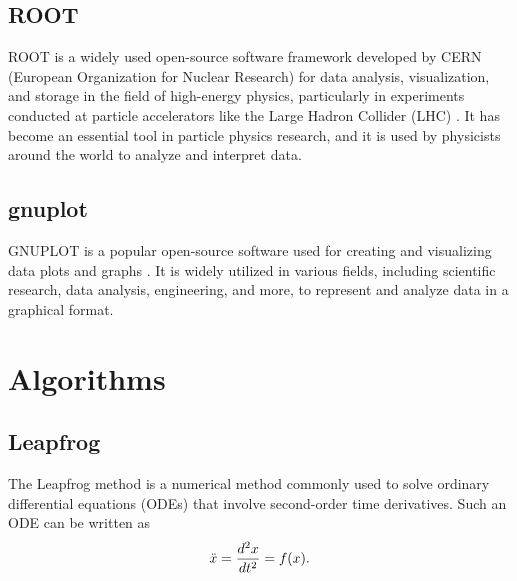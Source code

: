 \documentclass[a4paper,oneside,12pt]{report}
\numberwithin{equation}{chapter}
\begin{document}
\subsection{ROOT}
ROOT is a widely used open-source software framework developed by CERN (European Organization for Nuclear Research) for data analysis,
visualization, and storage in the field of high-energy physics, particularly in experiments conducted at particle accelerators 
like the Large Hadron Collider (LHC) \cite{root}. It has become an essential tool in particle physics research, 
and it is used by physicists around the world to analyze and interpret data.

\subsection{gnuplot}
GNUPLOT is a popular open-source software used for creating and visualizing data plots and graphs  \cite{gnuplot}. 
It is widely utilized in various fields, including scientific research, data analysis, engineering, and more, 
to represent and analyze data in a graphical format. 


\clearpage
\section{Algorithms}

\subsection{Leapfrog} \label{sec:leapfrog}
The Leapfrog method is a numerical method commonly used to solve ordinary differential equations (ODEs) that involve second-order time derivatives. Such an ODE can be written as
\vspace{-10pt}\begin{equation}
    \ddot{x} = \derivS{x}{t} = f(x) .\label{eq:second-order-ODE}
\vspace{-10pt}\end{equation}
\end{document}
